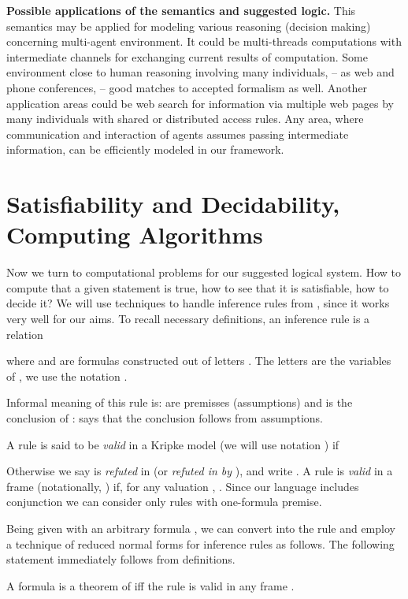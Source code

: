 \documentclass[runningheads]{llncs}
\begin{document}
{\bf Possible applications of the semantics and suggested logic.}
This semantics may be applied for modeling various reasoning (decision making) concerning multi-agent environment.
It could be multi-threads  computations with intermediate channels for exchanging current results of computation.
Some environment close to human reasoning involving many individuals, -- as web and phone conferences, --
 good matches to accepted formalism as well. Another application areas could be web search for information via multiple web pages by
 many
individuals with shared or distributed access rules.
Any area, where communication and interaction of agents assumes passing intermediate information, can be efficiently modeled in our framework.




\section{Satisfiability and Decidability, Computing Algorithms}

Now we turn  to computational problems for our suggested logical system.
How to compute that a given statement is true, how to see that it is satisfiable, how to decide it?
We will use techniques to handle
inference rules from \cite{rint,rit071,vr11,vrlc}, since it works very well for our aims. To recall necessary definitions,
an inference rule is
 a relation
 
where  and  are
 formulas constructed out of
letters .
The letters  are the
variables of , we use the notation .

Informal meaning of this rule is:  are premisses (assumptions) and  is the conclusion of :
 says that the conclusion follows from assumptions.



A rule
   is said to be \emph{valid} in
a Kripke model 
(we will use notation  ) if
 
Otherwise we say  is \emph{refuted} in  (or
\emph{refuted in  by }), and write . A
rule  is \emph{valid} in a frame  (notationally,
) if, for any valuation , .
Since our language  includes conjunction we can consider only
rules with one-formula premise.

 Being given with an arbitrary formula , we can convert  into the
  rule 
  and employ a technique of reduced normal forms for inference
rules as follows. The following statement immediately follows from definitions.

\begin{lemma} \label{p1}
A formula  is a theorem of 
iff the rule  is valid in any frame .
\end{lemma}
\end{document}
